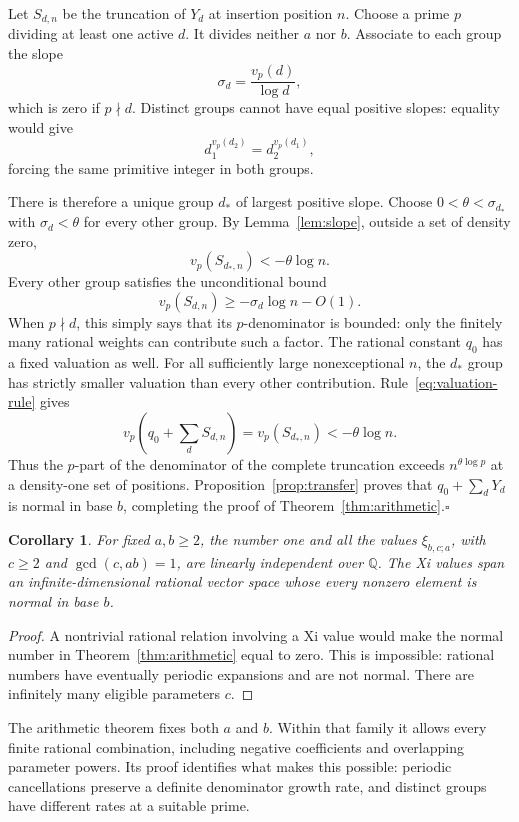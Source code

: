 \documentclass[11pt]{article}
\newtheorem{corollary}{Corollary}
\newcommand{\Q}{\mathbb Q}
\begin{document}
Let \(S_{d,n}\) be the truncation of \(Y_d\) at insertion position
\(n\). Choose a prime \(p\) dividing at least one active \(d\).
It divides neither \(a\) nor \(b\). Associate to each group the slope
\[
 \sigma_d=\frac{v_p(d)}{\log d},
\]
which is zero if \(p\nmid d\). Distinct groups cannot have equal
positive slopes: equality would give
\[
 d_1^{v_p(d_2)}=d_2^{v_p(d_1)},
\]
forcing the same primitive integer in both groups.

There is therefore a unique group \(d_*\) of largest positive slope.
Choose \(0<\theta<\sigma_{d_*}\) with
\(\sigma_d<\theta\) for every other group.
By Lemma~\ref{lem:slope}, outside a set of density zero,
\[
 v_p(S_{d_*,n})<-\theta\log n.
\]
Every other group satisfies the unconditional bound
\[
 v_p(S_{d,n})\ge-\sigma_d\log n-O(1).
\]
When \(p\nmid d\), this simply says that its \(p\)-denominator is
bounded: only the finitely many rational weights can contribute such a
factor. The rational constant \(q_0\) has a fixed valuation as well.
For all sufficiently large nonexceptional \(n\), the \(d_*\) group
has strictly smaller valuation than every other contribution.
Rule~\eqref{eq:valuation-rule} gives
\[
 v_p\!\left(q_0+\sum_d S_{d,n}\right)
       =v_p(S_{d_*,n})<-\theta\log n.
\]
Thus the \(p\)-part of the denominator of the complete truncation
exceeds \(n^{\theta\log p}\) at a density-one set of positions.
Proposition~\ref{prop:transfer} proves that
\(q_0+\sum_dY_d\) is normal in base \(b\), completing the proof
of Theorem~\ref{thm:arithmetic}.\hfill\(\square\)

\begin{corollary}\label{cor:independence}
For fixed \(a,b\ge2\), the number one and all the values
\(\xi_{b,c;a}\), with \(c\ge2\) and \(\gcd(c,ab)=1\), are
linearly independent over \(\Q\). The Xi values span an
infinite-dimensional rational vector space whose every nonzero element
is normal in base \(b\).
\end{corollary}

\begin{proof}
A nontrivial rational relation involving a Xi value would make the
normal number in Theorem~\ref{thm:arithmetic} equal to zero. This is
impossible: rational numbers have eventually periodic expansions and
are not normal. There are infinitely many eligible parameters \(c\).
\end{proof}

The arithmetic theorem fixes both \(a\) and \(b\). Within that
family it allows every finite rational combination, including negative
coefficients and overlapping parameter powers. Its proof identifies
what makes this possible: periodic cancellations preserve a definite
denominator growth rate, and distinct groups have different rates at
a suitable prime.
\end{document}
